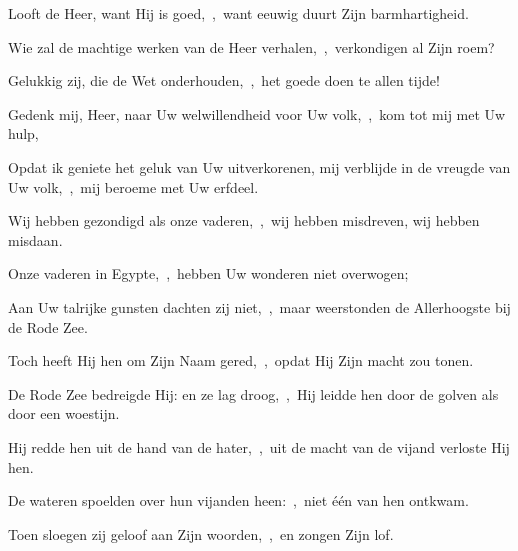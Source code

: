 \documentclass[12pt,twoside,a5paper]{article}
\begin{document}






\begin{halfparskip}
  Looft de Heer, want Hij is goed,~\sep\ want eeuwig duurt Zijn barmhartigheid.


  Wie zal de machtige werken van de Heer verhalen,~\sep\ verkondigen al Zijn roem?

  Gelukkig zij, die de Wet onderhouden,~\sep\ het goede doen te allen tijde!

  Gedenk mij, Heer, naar Uw welwillendheid voor Uw volk,~\sep\ kom tot mij met Uw hulp,

  Opdat ik geniete het geluk van Uw uitverkorenen, mij verblijde in de vreugde van Uw volk,~\sep\ mij beroeme met Uw erfdeel.
\end{halfparskip}


\begin{halfparskip}
  Wij hebben gezondigd als onze vaderen,~\sep\ wij hebben misdreven, wij hebben misdaan.

  Onze vaderen in Egypte,~\sep\ hebben Uw wonderen niet overwogen;

  Aan Uw talrijke gunsten dachten zij niet,~\sep\ maar weerstonden de Allerhoogste bij de Rode Zee.

  Toch heeft Hij hen om Zijn Naam gered,~\sep\ opdat Hij Zijn macht zou tonen.

  De Rode Zee bedreigde Hij: en ze lag droog,~\sep\ Hij leidde hen door de golven als door een woestijn.

  Hij redde hen uit de hand van de hater,~\sep\ uit de macht van de vijand verloste Hij hen.

  De wateren spoelden over hun vijanden heen:~\sep\ niet één van hen ontkwam.

  Toen sloegen zij geloof aan Zijn woorden,~\sep\ en zongen Zijn lof.
\end{halfparskip}
\end{document}
